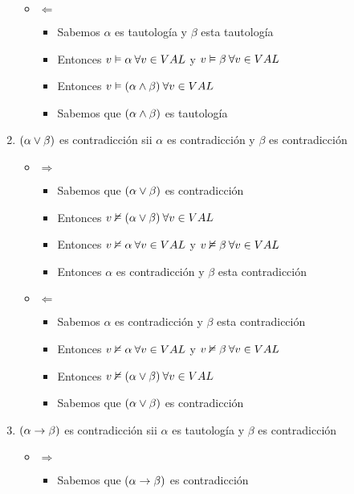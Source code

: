 \documentclass[14pt,a4paper,fleqn]{article}
\begin{document}
\begin{enumerate}
\begin{itemize}
\begin{itemize}
		\end{itemize}
		\item $\Leftarrow$
		\begin{itemize}
			\item Sabemos $\alpha$ es tautología y $\beta$ esta tautología
			\item Entonces $v \vDash \alpha \: \forall v \in VAL $ y $v \vDash \beta \: \forall v \in VAL $
			\item Entonces $v \vDash (\alpha \wedge \beta) \: \forall v \in VAL $			
			\item Sabemos que $(\alpha \wedge \beta)$ es tautología
		\end{itemize}
	\end{itemize}
	\item $(\alpha \vee \beta)$ es contradicción sii $\alpha$ es contradicción y $\beta$ es contradicción
	\begin{itemize}
		\item $\Rightarrow$
		\begin{itemize}
			\item Sabemos que $(\alpha \vee \beta)$ es contradicción
			\item Entonces $v \nvDash (\alpha \vee \beta) \: \forall v \in VAL $
			\item Entonces $v \nvDash \alpha \: \forall v \in VAL $ y $v \nvDash \beta \: \forall v \in VAL $
			\item Entonces $\alpha$ es contradicción y $\beta$ esta contradicción
		\end{itemize}
		\item $\Leftarrow$
		\begin{itemize}
			\item Sabemos $\alpha$ es contradicción y $\beta$ esta contradicción
			\item Entonces $v \nvDash \alpha \: \forall v \in VAL $ y $v \nvDash \beta \: \forall v \in VAL $
			\item Entonces $v \nvDash (\alpha \vee \beta) \: \forall v \in VAL $
			\item Sabemos que $(\alpha \vee \beta)$ es contradicción
		\end{itemize}
	\end{itemize}
	\item $(\alpha \rightarrow \beta)$ es contradicción sii $\alpha$ es tautología y $\beta$ es contradicción
	\begin{itemize}
		\item $\Rightarrow$
		\begin{itemize}
			\item Sabemos que $(\alpha \rightarrow \beta)$ es contradicción

\end{itemize}
\end{itemize}
\end{enumerate}
\end{document}
